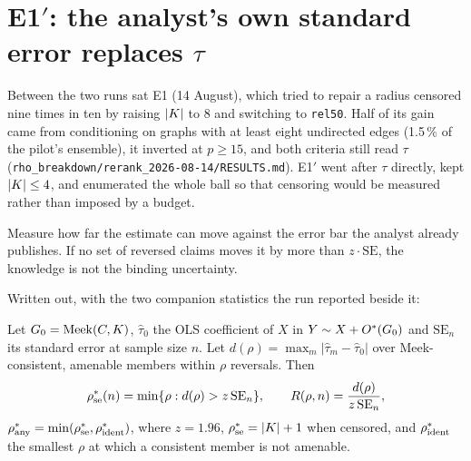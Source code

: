 
\begin{antes}
\end{antes}

\section{\texorpdfstring{E1$'$: the analyst's own standard error replaces $\tau$}{E1': the analyst's own standard error replaces tau}}

Between the two runs sat E1 (14 August), which tried to repair a radius censored nine times in ten
by raising $|K|$ to 8 and switching to \texttt{rel50}. Half of its gain came from conditioning
on graphs with at least eight undirected edges (1.5\,\% of the pilot's ensemble), it inverted at
$p \ge 15$, and both criteria still read $\tau$ (\texttt{rho\_breakdown/rerank\_2026-08-14/RESULTS.md}).
E1$'$ went after $\tau$ directly, kept $|K| \le 4$, and enumerated the whole ball so that
censoring would be measured rather than imposed by a budget.

\begin{ideia}
Measure how far the estimate can move against the error bar the analyst already publishes. If no
set of reversed claims moves it by more than $z \cdot \mathrm{SE}$, the knowledge is not the
binding uncertainty.
\end{ideia}

Written out, with the two companion statistics the run reported beside it:

\begin{definicao}
Let $G_0 = \mathrm{Meek}(C,K)$, $\hat\tau_0$ the OLS coefficient of $X$ in
$Y \sim X + O^{*}(G_0)$ and $\mathrm{SE}_n$ its standard error at sample size $n$. Let
$d(\rho) = \max_m |\hat\tau_m - \hat\tau_0|$ over Meek-consistent, amenable members within $\rho$
reversals. Then
\[
\rho^{*}_{\mathrm{se}}(n) = \min\{\rho : d(\rho) > z\,\mathrm{SE}_n\},\qquad
R(\rho,n) = \frac{d(\rho)}{z\,\mathrm{SE}_n},
\]
$\rho^{*}_{\mathrm{any}} = \min(\rho^{*}_{\mathrm{se}}, \rho^{*}_{\mathrm{ident}})$,
where $z = 1.96$, $\rho^{*}_{\mathrm{se}} = |K| + 1$ when censored, and $\rho^{*}_{\mathrm{ident}}$
the smallest $\rho$ at which a consistent member is not amenable.
\end{definicao}

